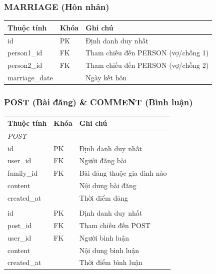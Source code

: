 \subsubsection{MARRIAGE (Hôn nhân)}
\begin{longtable}{@{}p{3cm}p{2cm}p{9.5cm}@{}}
\toprule
\textbf{Thuộc tính} & \textbf{Khóa} & \textbf{Ghi chú} \\
\midrule
id & PK & Định danh duy nhất \\
person1\_id & FK & Tham chiếu đến PERSON (vợ/chồng 1) \\
person2\_id & FK & Tham chiếu đến PERSON (vợ/chồng 2) \\
marriage\_date & & Ngày kết hôn \\
\bottomrule
\end{longtable}

\subsubsection{POST (Bài đăng) \& COMMENT (Bình luận)}
\begin{longtable}{@{}p{3cm}p{2cm}p{9.5cm}@{}}
\toprule
\textbf{Thuộc tính} & \textbf{Khóa} & \textbf{Ghi chú} \\
\midrule
\multicolumn{3}{l}{\textit{POST}} \\
id & PK & Định danh duy nhất \\
user\_id & FK & Người đăng bài \\
family\_id & FK & Bài đăng thuộc gia đình nào \\
content & & Nội dung bài đăng \\
created\_at & & Thời điểm đăng \\
\addlinespace
\multicolumn{3}{l}{\textit{COMMENT}} \\
id & PK & Định danh duy nhất \\
post\_id & FK & Tham chiếu đến POST \\
user\_id & FK & Người bình luận \\
content & & Nội dung bình luận \\
created\_at & & Thời điểm bình luận \\
\bottomrule
\end{longtable}

